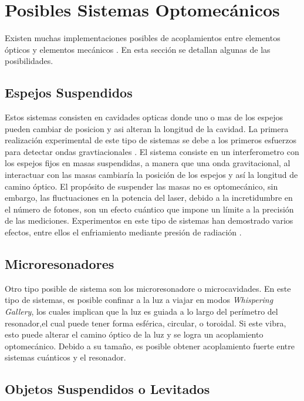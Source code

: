 \documentclass[a4paper,10pt]{report}
\begin{document}
\section{Posibles Sistemas Optomecánicos}

Existen muchas implementaciones posibles de acoplamientos entre elementos ópticos y elementos mecánicos \cite{KippenberCO}. En esta sección se detallan algunas de las posibilidades.

\subsection{Espejos Suspendidos}

Estos sistemas consisten en cavidades opticas donde uno o mas de los espejos pueden cambiar de posicion y asi alteran la longitud de la cavidad. La primera realización experimental de este tipo de sistemas se debe a los primeros esfuerzos para detectar ondas gravtiacionales \cite{AbramoviciLIGO}. El sistema consiste en un interferometro con los espejos fijos en masas suspendidas, a manera que una onda gravitacional, al interactuar con las masas cambiaría la posición de los espejos y así la longitud de camino óptico. El propósito de suspender las masas no es optomecánico, sin embargo, las fluctuaciones en la potencia del laser, debido a la incretidumbre en el número de fotones, son un efecto cuántico que impone un límite a la precisión de las mediciones\cite{CavesIF}. Experimentos en este tipo de sistemas han demostrado varios efectos, entre ellos el enfriamiento mediante presión de radiación \cite{CorbittOC}.

\subsection{Microresonadores}

Otro tipo posible de sistema son los microresonadore o microcavidades. En este tipo de sistemas, es posible confinar a la luz a viajar en modos \textit{Whispering Gallery}, los cuales implican que la luz es guiada a lo largo del perímetro del resonador,el cual puede tener forma esférica, circular, o toroidal\cite{VahalaOM}. Si este vibra, esto puede alterar el camino óptico de la luz y se logra un acoplamiento optomecánico. Debido a su tamaño, es posible obtener acoplamiento fuerte entre sistemas cuánticos y el resonador\cite{VerhagenMOC}.

\subsection{Objetos Suspendidos o Levitados}
\end{document}
